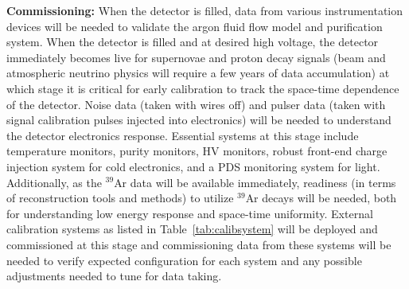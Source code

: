 \textbf{Commissioning:} When the detector is filled, data from various instrumentation devices will be needed to validate the argon fluid flow model and purification system. When the detector is filled and at desired high voltage, the detector immediately becomes live for supernovae and proton decay signals (beam and atmospheric neutrino physics will require a few years of data accumulation) at which stage it is critical for early calibration to track the space-time dependence of the detector. Noise data (taken with wires off) and pulser data (taken with signal calibration pulses injected into electronics) will be needed to understand the detector electronics response. Essential systems at this stage include temperature monitors, purity monitors, HV monitors, robust front-end charge injection system for cold electronics, and a PDS monitoring system for light. Additionally, as the $^{39}$Ar data will be available immediately, readiness (in terms of reconstruction tools and methods) to utilize $^{39}$Ar decays will be needed, both for understanding low energy response and space-time uniformity. External calibration systems as listed in Table~\ref{tab:calibsystem} will be deployed and commissioned at this stage and commissioning data from these systems will be needed to verify expected configuration for each system and any possible adjustments needed to tune for data taking.

